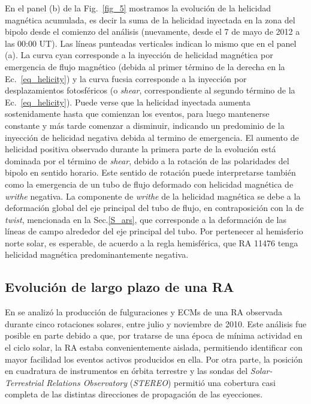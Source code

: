 \documentclass[baaa]{baaa}
\begin{document}
En el panel (b) de la Fig.~\ref{fig_5} mostramos la evolución de la helicidad magnética acumulada, es decir la suma de la helicidad inyectada en la zona del bipolo desde el comienzo del análisis (nuevamente, desde el 7 de mayo de 2012 a las 00:00 UT). Las líneas punteadas verticales indican lo mismo que en el panel (a). La curva cyan corresponde a la inyección de helicidad magnética por emergencia de flujo magnético (debida al primer término de la derecha en la Ec.~\ref{eq_helicity}) y la curva fucsia corresponde a la inyección por desplazamientos fotosféricos (o {\sl shear}, correspondiente al segundo término de la Ec.~\ref{eq_helicity}). Puede verse que la helicidad inyectada aumenta sostenidamente hasta que comienzan los eventos, para luego mantenerse constante y más tarde comenzar a disminuir, indicando un predominio de la inyección de helicidad negativa debida al termino de emergencia. El aumento de helicidad positiva observado durante la primera parte de la evolución está dominada por el término de {\sl shear}, debido a la rotación de las polaridades del bipolo en sentido horario. Este sentido de rotación puede interpretarse también como la emergencia de un tubo de flujo deformado con helicidad magnética de {\sl writhe} negativa. La componente de {\sl writhe} de la helicidad magnética se debe a la deformación global del eje principal del tubo de flujo, en contraposición con la de {\sl twist}, mencionada en la Sec.\ref{S_ars}, que corresponde a la deformación de las líneas de campo alrededor del eje principal del tubo. Por pertenecer al hemisferio norte solar, es esperable, de acuerdo a la regla hemisférica, que RA 11476 tenga helicidad magnética predominantemente negativa.

\subsection{Evolución de largo plazo de una RA}

En \citep{iglesias2020} se analizó la producción de fulguraciones y ECMs de una RA observada durante cinco rotaciones solares, entre julio y noviembre de 2010. Este análisis fue posible en parte debido a que, por tratarse de una época de mínima actividad en el ciclo solar, la RA estaba convenientemente aislada, permitiendo identificar con mayor facilidad los eventos activos producidos en ella. Por otra parte, la posición en cuadratura de instrumentos en órbita terrestre y las sondas del {\sl Solar-Terrestrial Relations Observatory} ({\sl STEREO}) permitió una cobertura casi completa de las distintas direcciones de propagación de las eyecciones.
\end{document}
